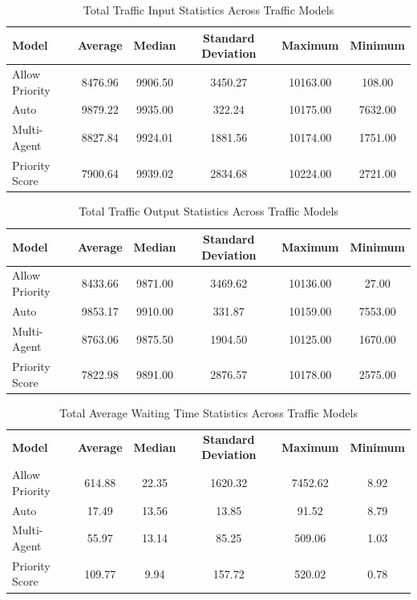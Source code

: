 \documentclass[sigconf]{acmart}
\begin{document}


\clearpage

\appendix



\begin{table}[]
\centering
\caption{Total Traffic Input Statistics Across Traffic Models}
\label{tab:tab2}
\begin{tabular}{lccccc}
\toprule
\textbf{Model} & \textbf{Average} & \textbf{Median} & \textbf{Standard Deviation} & \textbf{Maximum} & \textbf{Minimum} \\
\midrule
Allow Priority & 8476.96 & 9906.50 & 3450.27 & 10163.00  & 108.00  \\ 
Auto &  9879.22 & 9935.00 & 322.24 & 10175.00  & 7632.00  \\ 
Multi-Agent & 8827.84 & 9924.01 & 1881.56 & 10174.00   & 1751.00 \\ 
Priority Score &  7900.64 & 9939.02 & 2834.68 & 10224.00  & 2721.00  \\ 

\bottomrule
\end{tabular}
\end{table}


\begin{table}[]
\centering
\caption{Total Traffic Output Statistics Across Traffic Models}
\label{tab:tab1}
\begin{tabular}{lccccc}
\toprule
\textbf{Model} & \textbf{Average} & \textbf{Median} & \textbf{Standard Deviation} & \textbf{Maximum} & \textbf{Minimum} \\
\midrule
Allow Priority & 8433.66 & 9871.00 & 3469.62 & 10136.00  & 27.00  \\ 
Auto & 9853.17 & 9910.00 & 331.87 &  10159.00 & 7553.00 \\ 
Multi-Agent & 8763.06 & 9875.50 & 1904.50 & 10125.00  & 1670.00 \\ 
Priority Score &  7822.98 & 9891.00 & 2876.57 & 10178.00  &  2575.00 \\ 

\bottomrule
\end{tabular}
\end{table}


\begin{table}[]
\centering
\caption{Total Average Waiting Time Statistics Across Traffic Models}
\label{tab:tab3}
\begin{tabular}{lccccc}
\toprule
\textbf{Model} & \textbf{Average} & \textbf{Median} & \textbf{Standard Deviation} & \textbf{Maximum} & \textbf{Minimum} \\
Allow Priority &  614.88 & 22.35 & 1620.32 & 7452.62  & 8.92 \\ 
Auto & 17.49 & 13.56 & 13.85 &  91.52 & 8.79 \\ 
Multi-Agent & 55.97 & 13.14 & 85.25 & 509.06  & 1.03 \\ 
Priority Score &  109.77 &  9.94 & 157.72 & 520.02  &  0.78  \\ 

\bottomrule
\end{tabular}
\end{table}
\end{document}
